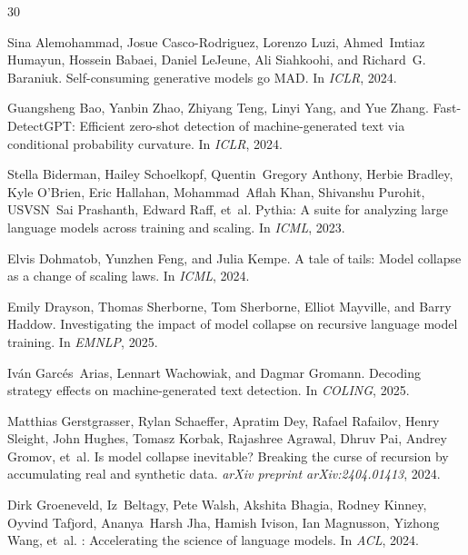 \documentclass[11pt,a4paper]{article}
\begin{document}
\begin{thebibliography}{30}

Sina Alemohammad, Josue Casco-Rodriguez, Lorenzo Luzi, Ahmed~Imtiaz Humayun, Hossein Babaei, Daniel LeJeune, Ali Siahkoohi, and Richard~G. Baraniuk.
\newblock Self-consuming generative models go {MAD}.
\newblock In \emph{ICLR}, 2024.

Guangsheng Bao, Yanbin Zhao, Zhiyang Teng, Linyi Yang, and Yue Zhang.
\newblock Fast-{DetectGPT}: Efficient zero-shot detection of machine-generated text via conditional probability curvature.
\newblock In \emph{ICLR}, 2024.

Stella Biderman, Hailey Schoelkopf, Quentin~Gregory Anthony, Herbie Bradley, Kyle O'Brien, Eric Hallahan, Mohammad~Aflah Khan, Shivanshu Purohit, USVSN~Sai Prashanth, Edward Raff, et~al.
\newblock Pythia: A suite for analyzing large language models across training and scaling.
\newblock In \emph{ICML}, 2023.

Elvis Dohmatob, Yunzhen Feng, and Julia Kempe.
\newblock A tale of tails: Model collapse as a change of scaling laws.
\newblock In \emph{ICML}, 2024.

Emily Drayson, Thomas Sherborne, Tom Sherborne, Elliot Mayville, and Barry Haddow.
\newblock Investigating the impact of model collapse on recursive language model training.
\newblock In \emph{EMNLP}, 2025.

Iv\'an Garc\'es~Arias, Lennart Wachowiak, and Dagmar Gromann.
\newblock Decoding strategy effects on machine-generated text detection.
\newblock In \emph{COLING}, 2025.

Matthias Gerstgrasser, Rylan Schaeffer, Apratim Dey, Rafael Rafailov, Henry Sleight, John Hughes, Tomasz Korbak, Rajashree Agrawal, Dhruv Pai, Andrey Gromov, et~al.
\newblock Is model collapse inevitable? {Breaking} the curse of recursion by accumulating real and synthetic data.
\newblock \emph{arXiv preprint arXiv:2404.01413}, 2024.

Dirk Groeneveld, Iz~Beltagy, Pete Walsh, Akshita Bhagia, Rodney Kinney, Oyvind Tafjord, Ananya~Harsh Jha, Hamish Ivison, Ian Magnusson, Yizhong Wang, et~al.
: Accelerating the science of language models.
\newblock In \emph{ACL}, 2024.


\end{thebibliography}
\end{document}
